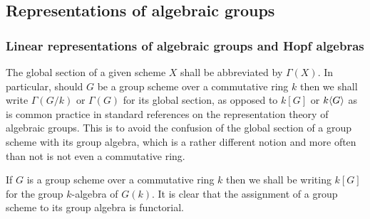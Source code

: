     \subsection{Representations of algebraic groups}
        \subsubsection{Linear representations of algebraic groups and Hopf algebras}
            \begin{convention}
                The global section of a given scheme $X$ shall be abbreviated by $\Gamma(X)$. In particular, should $G$ be a group scheme over a commutative ring $k$ then we shall write $\Gamma(G/k)$ or $\Gamma(G)$ for its global section, as opposed to $k[G]$ or $k\langle G\rangle$ as is common practice in standard references on the representation theory of algebraic groups. This is to avoid the confusion of the global section of a group scheme with its group algebra, which is a rather different notion and more often than not is not even a commutative ring.
            \end{convention}
            \begin{convention}
                If $G$ is a group scheme over a commutative ring $k$ then we shall be writing $k[G]$ for the group $k$-algebra of $G(k)$. It is clear that the assignment of a group scheme to its group algebra is functorial. 
            \end{convention}
            

